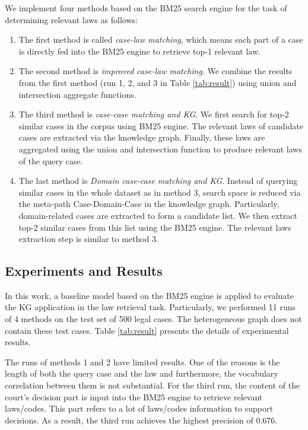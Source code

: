 \documentclass[conference]{IEEEtran}
\begin{document}
We implement four methods based on the BM25 search engine for the task of determining relevant laws as follows:
\begin{enumerate}
    \item The first method is called \textit{case-law matching}, which means each part of a case is directly fed into the BM25 engine to retrieve top-1 relevant law.
    \item The second method is \textit{improved case-law matching}. We combine the results from the first method (run 1, 2, and 3 in Table \ref{tab:result}) using union and intersection aggregate functions.
    \item The third method is \textit{case-case matching and KG}. We first search for top-2 similar cases in the corpus using BM25 engine. The relevant laws of candidate cases are extracted via the knowledge graph. Finally, these laws are aggregated using the union and intersection function to produce relevant laws of the query case.
    \item The last method is \textit{Domain case-case matching and KG}. Instead of querying similar cases in the whole dataset as in method 3, search space is reduced via the meta-path Case-Domain-Case in the knowledge graph. Particularly, domain-related cases are extracted to form a candidate list. We then extract top-2 similar cases from this list using the BM25 engine.
    The relevant laws extraction step is similar to method 3.
\end{enumerate}

\subsection{Experiments and Results}
In this work, a baseline model based on the BM25 engine is applied to evaluate the KG application in the law retrieval task. 
Particularly, we performed 11 runs of 4 methods on the test set of 500 legal cases. The heterogeneous graph does not contain these test cases. Table \ref{tab:result} presents the details of experimental results. 

The runs of methods 1 and 2 have limited results. One of the reasons is the length of both the query case and the law and furthermore, the vocabulary correlation between them is not substantial.
For the third run, the content of the court's decision part is input into the BM25 engine to retrieve relevant laws/codes. This part refers to a lot of laws/codes information to support decisions. As a result, the third run achieves the highest precision of 0.676.
\end{document}
